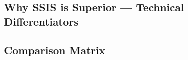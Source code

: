\documentclass[11pt,a4paper]{article}
\begin{document}
\newpage
\begin{landscape}

\section{Why SSIS is Superior --- Technical Differentiators}

\subsection{Comparison Matrix}

\vspace{0.3cm}


\end{landscape}
\end{document}
